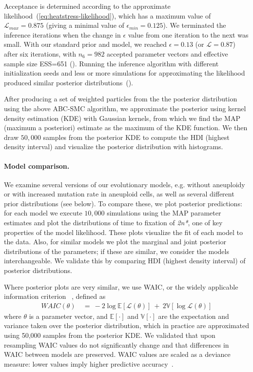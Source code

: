 \documentclass[12pt]{extarticle}
\newcommand{\likelihood}{\mathcal{L}}
\newcommand{\eumt}{\emph{2n*}}
\begin{document}
Acceptance is determined according to the approximate likelihood~(\cref{eq:heatstress-likelihood}), which has a maximum value of $\likelihood_{max}=0.875$ (giving a minimal value of $\epsilon_{min}=0.125$). We terminated the inference iterations when the change in $\epsilon$ value from one iteration to the next was small.
With our standard prior and model, we reached $\epsilon=0.13$ (or $\likelihood=0.87$) after six iterations, with $n_6=982$ accepted parameter vectors and effective sample size ESS=651 (). Running the inference algorithm with different initialization seeds and less or more simulations for approximating the likelihood produced similar posterior distributions~(). 

After producing a set of weighted particles from the the posterior distribution using the above ABC-SMC algorithm, we approximate the posterior using kernel density estimation (KDE) with Gaussian kernels, from which we find the MAP (maximum a posteriori) estimate as the maximum of the KDE function. We then draw $50,000$ samples from the posterior KDE to compute the HDI (highest density interval) and visualize the posterior distribution with histograms.


\paragraph{Model comparison.} 
We examine several versions of our evolutionary models, e.g. without aneuploidy or with increased mutation rate in aneuploid cells, as well as several different prior distributions (see below).
To compare these, we plot posterior predictions: for each model we execute $10,000$ simulations using the MAP parameter estimates and plot the distributions of time to fixation of \eumt, one of key properties of the model likelihood. These plots visualize the fit of each model to the data. 
Also, for similar models we plot the marginal and joint posterior distributions of the parameters; if these are similar, we consider the models interchangeable. We validate this by comparing HDI (highest density interval) of posterior distributions.

Where posterior plots are very similar, we use WAIC, or the widely applicable information criterion ~\citep{gelman2013bayesian}, defined as
\begin{equation} \label{eq:WAIC}
\begin{aligned}
\mathit{WAIC}(\theta) &\ =\ 
-2\log\mathbb{E}[\likelihood(\theta)]\ +\ 2\mathbb{V}[\log\likelihood(\theta)]
\end{aligned}
\end{equation}
where $\theta$ is a parameter vector, and $\mathbb{E}[\cdot]$ and $\mathbb{V}[\cdot]$ are the expectation and variance taken over the posterior distribution, which in practice are approximated using 50,000 samples from the posterior KDE. We validated that upon resampling WAIC values do not significantly change and that differences in WAIC between models are preserved.
WAIC values are scaled as a deviance measure: lower values imply higher predictive accuracy~\citep{Kass1995}.
 
\end{document}

